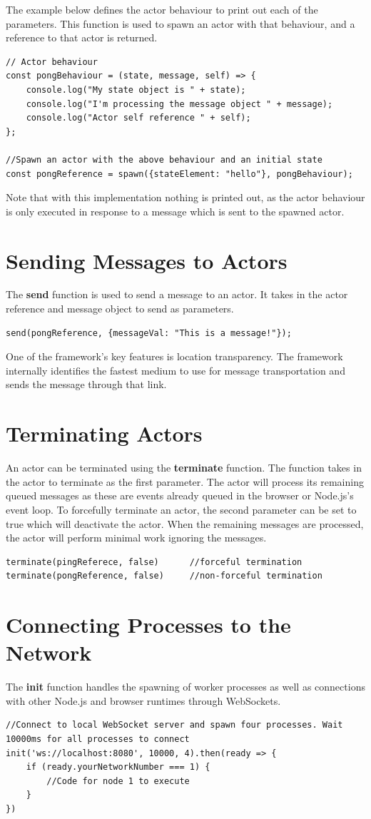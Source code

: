 \documentclass[12pt, a4paper]{report}
\theoremstyle{definition}
\theoremstyle{definition}%
\theoremstyle{definition}%
\theoremstyle{definition}%
\theoremstyle{definition}%
\theoremstyle{definition}%
\begin{document}
The example below defines the actor behaviour to print out each of the parameters. This function is used to spawn an actor with that behaviour, and a reference to that actor is returned.
\newpage
\begin{lstlisting}
// Actor behaviour
const pongBehaviour = (state, message, self) => {
    console.log("My state object is " + state);
    console.log("I'm processing the message object " + message);
    console.log("Actor self reference " + self);
};

//Spawn an actor with the above behaviour and an initial state
const pongReference = spawn({stateElement: "hello"}, pongBehaviour);
\end{lstlisting}
Note that with this implementation nothing is printed out, as the actor behaviour is only executed in response to a message which is sent to the spawned actor.
\section{Sending Messages to Actors}
The \textbf{send} function is used to send a message to an actor. It takes in the actor reference and message object to send as parameters.
\begin{lstlisting}
send(pongReference, {messageVal: "This is a message!"});
\end{lstlisting}
One of the framework's key features is location transparency. The framework internally identifies the fastest medium to use for message transportation and sends the message through that link.
\section{Terminating Actors}
An actor can be terminated using the \textbf{terminate} function. The function takes in the actor to terminate as the first parameter. The actor will process its remaining queued messages as these are events already queued in the browser or Node.js's event loop. To forcefully terminate an actor, the second parameter can be set to true which will deactivate the actor. When the remaining messages are processed, the actor will perform minimal work ignoring the messages.
\begin{lstlisting}
terminate(pingReferece, false)      //forceful termination
terminate(pongReference, false)     //non-forceful termination
\end{lstlisting}
\section{Connecting Processes to the Network}
The \textbf{init} function handles the spawning of worker processes as well as connections with other Node.js and browser runtimes through WebSockets.
\begin{lstlisting}
//Connect to local WebSocket server and spawn four processes. Wait 10000ms for all processes to connect
init('ws://localhost:8080', 10000, 4).then(ready => {
    if (ready.yourNetworkNumber === 1) {
        //Code for node 1 to execute
    }
})
\end{lstlisting}
 
\end{document}
